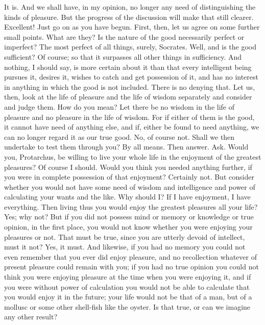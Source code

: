 \documentclass[letterpaper,12pt]{article}
\newcommand{\stephpag}[1]{\marginnote{\small\itshape\fontfamily{ppl}\selectfont #1}}
\begin{document}
\begin{drama}
\protarchusspeaks
It is.
\socratesspeaks
And we shall have, in my opinion, no longer any need of distinguishing the kinds of pleasure. But the progress of the discussion will make that still clearer.
\protarchusspeaks
Excellent! Just go on as you have begun.
\socratesspeaks
First, then, let us agree on some further small points.
\protarchusspeaks
What are they?
\socratesspeaks
Is the nature of the good necessarily perfect \stephpag{d} or imperfect?
\protarchusspeaks
The most perfect of all things, surely, Socrates.
\socratesspeaks
Well, and is the good sufficient?
\protarchusspeaks
Of course; so that it surpasses all other things in sufficiency.
\socratesspeaks
And nothing, I should say, is more certain about it than that every intelligent being pursues it, desires it, wishes to catch and get possession of it, and has no interest in anything in which the good is not included.
\protarchusspeaks
There is no denying that. \stephpag{e}
\socratesspeaks
Let us, then, look at the life of pleasure and the life of wisdom separately and consider and judge them.
\protarchusspeaks
How do you mean?
\socratesspeaks
Let there be no wisdom in the life of pleasure and no pleasure in the life of wisdom. For if either of them is the good, it cannot have need of anything else, and if, either be found to need anything, \stephpag{21 a} we can no longer regard it as our true good.
\protarchusspeaks
No, of course not.
\socratesspeaks
Shall we then undertake to test them through you?
\protarchusspeaks
By all means.
\socratesspeaks
Then answer.
\protarchusspeaks
Ask.
\socratesspeaks
Would you, Protarchus, be willing to live your whole life in the enjoyment of the greatest pleasures?
\protarchusspeaks
Of course I should.
\socratesspeaks
Would you think you needed anything further, if you were in complete possession of that enjoyment?
\protarchusspeaks
Certainly not.
\socratesspeaks
But consider whether you would not have some need of wisdom and intelligence and \stephpag{b} power of calculating your wants and the like.
\protarchusspeaks
Why should I? If I have enjoyment, I have everything.
\socratesspeaks
Then living thus you would enjoy the greatest pleasures all your life?
\protarchusspeaks
Yes; why not?
\socratesspeaks
But if you did not possess mind or memory or knowledge or true opinion, in the first place, you would not know whether you were enjoying your pleasures or not. That must be true, since you are utterly devoid of intellect, must it not?
\protarchusspeaks
Yes, it must. \stephpag{c}
\socratesspeaks
And likewise, if you had no memory you could not even remember that you ever did enjoy pleasure, and no recollection whatever of present pleasure could remain with you; if you had no true opinion you could not think you were enjoying pleasure at the time when you were enjoying it, and if you were without power of calculation you would not be able to calculate that you would enjoy it in the future; your life would not be that of a man, but of a mollusc or some other shell-fish like the oyster. \stephpag{d} Is that true, or can we imagine any other result?

\end{drama}
\end{document}
